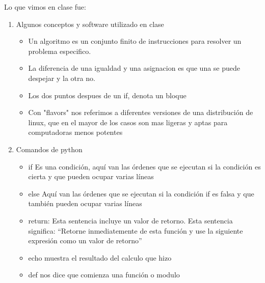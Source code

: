\documentclass[letterpaper, 12pt, oneside]{article}%
\begin{document}
Lo que vimos en clase fue:%
\begin{enumerate}%
	\item Algunos conceptos y software utilizado en clase%
		\begin{itemize}
			\item Un algoritmo es un conjunto finito de instrucciones para resolver un problema especifico.
			\item La diferencia de una igualdad y una asignacion es que una se puede despejar y la otra no.			
			\item Los dos puntos despues de un if, denota un bloque
			\item Con "flavors" nos referimos a diferentes versiones de una distribución de linux, que en el mayor de los casos son mas ligeras y aptas para computadoras menos potentes
			
		\end{itemize}
	
	\item Comandos de python%
	\begin{itemize}%
		\item if Es una condición, aquí van las órdenes que se ejecutan si la condición es cierta
		y que pueden ocupar varias líneas
		\item else Aquí van las órdenes que se ejecutan si la condición if es falsa y que también pueden ocupar varias líneas
		\item return: Esta sentencia incluye un valor de retorno. Esta sentencia significa: “Retorne inmediatemente de esta función y use la siguiente expresión como un valor de retorno”
		\item echo muestra el resultado del calculo que hizo
		\item def nos dice que comienza una función o modulo
		
		
				

\end{itemize}
\end{enumerate}
\end{document}

